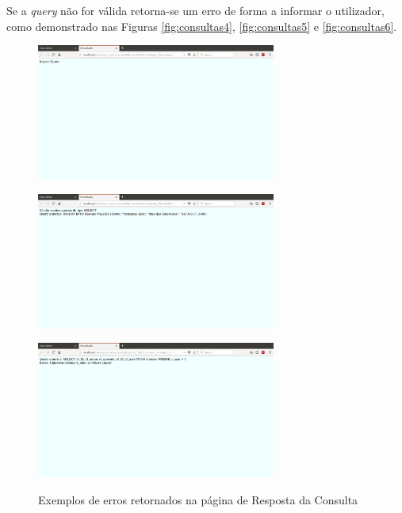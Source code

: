 \documentclass[11pt,twoside,a4paper]{report}
\begin{document}
Se a \textit{query} não for válida retorna-se um erro de forma a informar o utilizador, como demonstrado nas Figuras \ref{fig:consultas4}, \ref{fig:consultas5} e \ref{fig:consultas6}.
\newpage
\begin{figure}[H]
	\centering
	\begin{minipage}{1\textwidth}
		\begin{center}
			\includegraphics[width=0.7\textwidth]{consultas03} %
			\label{fig:consultas4}
		\end{center}
	\end{minipage}
	\begin{minipage}{1\textwidth}
		\begin{center}
			\includegraphics[width=0.7\textwidth]{consultas04} %
			\label{fig:consultas5}
		\end{center}
	\end{minipage}
	\begin{minipage}{1\textwidth}
		\begin{center}
			\includegraphics[width=0.7\textwidth]{consultas05} %
			\label{fig:consultas6}
		\end{center}
	\end{minipage}
	\caption{Exemplos de erros retornados na página de Resposta da Consulta}
	\label{fig:consultas3}
\end{figure}
\end{document}
